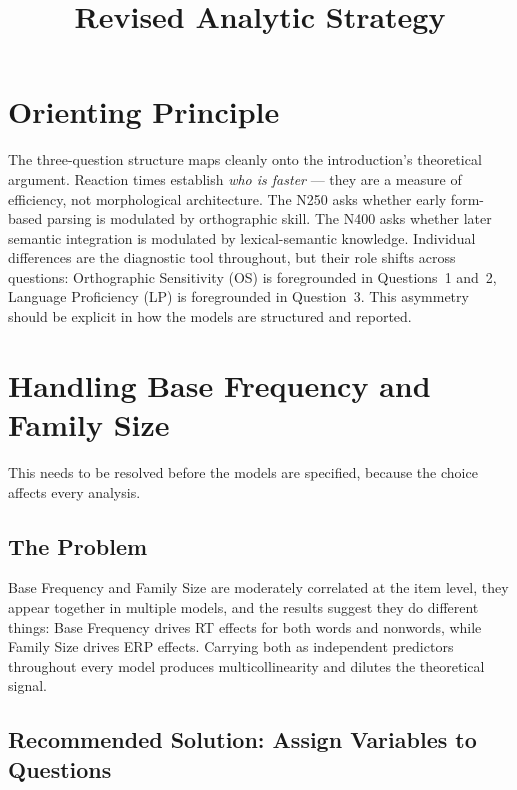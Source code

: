 \documentclass[12pt]{article}
\title{\textbf{Revised Analytic Strategy}}
\date{}
\begin{document}
	
	\scriptsize
	
	\maketitle
	
	\section{Orienting Principle}
	
	The three-question structure maps cleanly onto the introduction's theoretical argument. Reaction times establish \textit{who is faster} --- they are a measure of efficiency, not morphological architecture. The N250 asks whether early form-based parsing is modulated by orthographic skill. The N400 asks whether later semantic integration is modulated by lexical-semantic knowledge. Individual differences are the diagnostic tool throughout, but their role shifts across questions: Orthographic Sensitivity (OS) is foregrounded in Questions~1 and~2, Language Proficiency (LP) is foregrounded in Question~3. This asymmetry should be explicit in how the models are structured and reported.
	
	\section{Handling Base Frequency and Family Size}
	
	This needs to be resolved before the models are specified, because the choice affects every analysis.
	
	\subsection{The Problem}
	
	Base Frequency and Family Size are moderately correlated at the item level, they appear together in multiple models, and the results suggest they do different things: Base Frequency drives RT effects for both words and nonwords, while Family Size drives ERP effects. Carrying both as independent predictors throughout every model produces multicollinearity and dilutes the theoretical signal.
	
	\subsection{Recommended Solution: Assign Variables to Questions}
	
\end{document}
